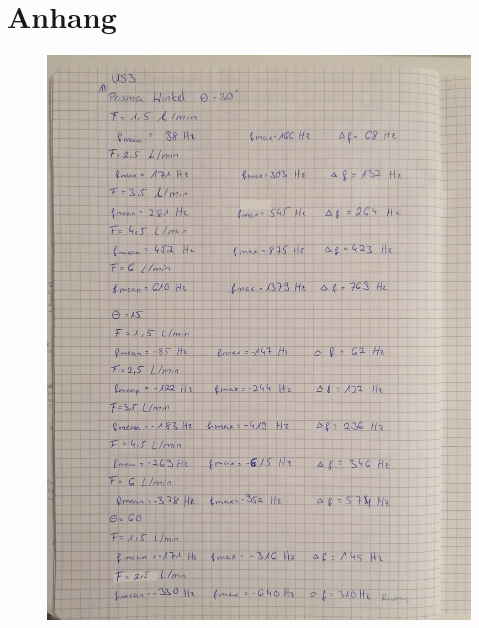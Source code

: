 \section{Anhang}

\begin{figure}
    \centering
    \includegraphics[width=\textwidth]{content/Anhang1.jpg}
\end{figure}
    
